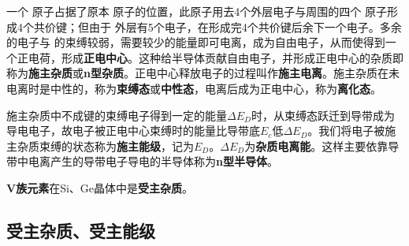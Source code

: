 一个 原子占据了原本 原子的位置，此原子用去4个外层电子与周围的四个 原子形成4个共价键；但由于 外层有5个电子，在形成完4个共价键后余下一个电子。多余的电子与 的束缚较弱，需要较少的能量即可电离，成为自由电子，从而使得到一个正电荷，形成\textbf{正电中心}。这种给半导体贡献自由电子，并形成正电中心的杂质即称为\textbf{施主杂质}或\textbf{n型杂质}。正电中心释放电子的过程叫作\textbf{施主电离}。施主杂质在未电离时是中性的，称为\textbf{束缚态}或\textbf{中性态}，电离后成为正电中心，称为\textbf{离化态}。

施主杂质中不成键的束缚电子得到一定的能量$\Delta E_D$时，从束缚态跃迁到导带成为导电电子，故电子被正电中心束缚时的能量比导带底$E_c$低$\Delta E_D$。我们将电子被施主杂质束缚的状态称为\textbf{施主能级}，记为$E_D$。$\Delta E_D$为\textbf{杂质电离能}。这样主要依靠导带中电离产生的导带电子导电的半导体称为\textbf{n型半导体}。

\textbf{V族元素}在Si、Ge晶体中是\textbf{受主杂质}。

\subsection{受主杂质、受主能级}

